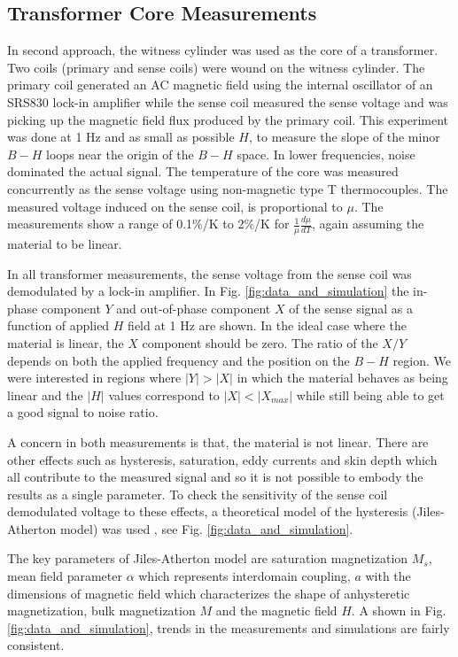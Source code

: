 \documentclass[review]{elsarticle}
\begin{document}
\subsection{Transformer Core Measurements}
In second approach, the witness cylinder was used as the core of a transformer. Two coils (primary and sense coils) were wound on the witness cylinder. The primary coil generated an AC magnetic field using the internal oscillator of an SRS830 lock-in amplifier while the sense coil measured the sense voltage and was picking up the magnetic field flux produced by the primary coil. This experiment was done at 1 Hz and as small as possible $H$, to measure the slope of the minor $B-H$ loops near the origin of the $B-H$ space. In lower frequencies, noise dominated the actual signal.
The temperature of the core was measured concurrently as the sense voltage using non-magnetic type T thermocouples.
The measured voltage induced on the sense coil, is proportional to $\mu$.
The measurements show a range of 0.1\%/K to 2\%/K for $\frac{1}{\mu}\frac{d\mu}{dT}$, again assuming the material to be linear.

In all transformer measurements, the sense voltage from the sense coil was demodulated by a lock-in amplifier. In Fig. \ref{fig:data_and_simulation} the in-phase component $Y$ and out-of-phase component $X$ of the sense signal as a function of applied $H$ field at 1 Hz are shown. In the ideal case where the material is linear, the $X$ component should be zero. The ratio of the $X/Y$ depends on both the applied frequency and the position on the $B-H$ region. We were interested in regions where $\vert Y \vert > \vert X \vert $ in which the material behaves as being linear and the $\vert H \vert $ values correspond to $\vert X \vert < \vert X_{max} \vert$ while still being able to get a good signal to noise ratio.


A concern in both measurements is that, the material is not linear. There are other effects such as hysteresis, saturation, eddy currents and skin depth which all contribute to the measured signal and so it is not possible to embody the results as a single parameter. 
To check the sensitivity of the sense coil demodulated voltage to these effects, a theoretical model of the hysteresis (Jiles-Atherton model) was used \cite{bib:jiles}, see Fig.  \ref{fig:data_and_simulation}. 

The key parameters of Jiles-Atherton model are saturation magnetization $M_s$, mean field parameter $\alpha$ which represents interdomain coupling, $a$ with the dimensions of magnetic field which characterizes the shape of anhysteretic magnetization, bulk magnetization $M$ and the magnetic field $H$. A shown in Fig. \ref{fig:data_and_simulation}, trends in the measurements and simulations are fairly consistent.
\end{document}
